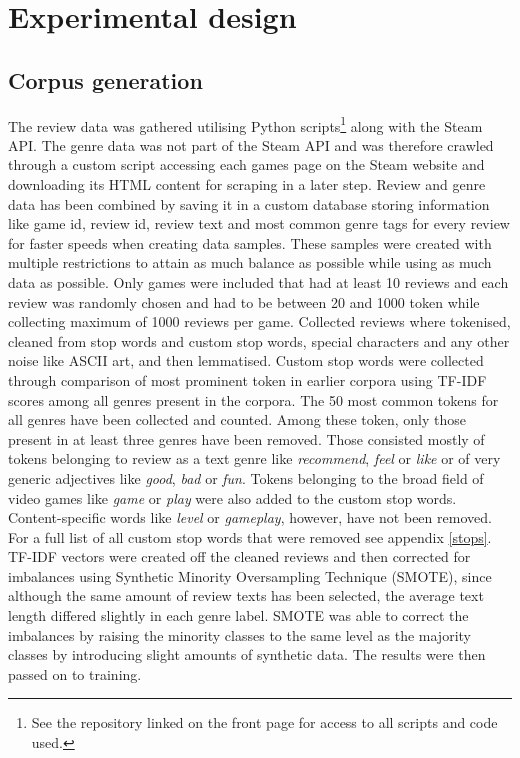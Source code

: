 \documentclass[11pt, a4paper]{article}
\begin{document}
\section{Experimental design}
\subsection{Corpus generation}
The review data was gathered utilising Python scripts\footnote{See the repository linked on the front page for access to all scripts and code used.} along with the Steam API. The genre data was not part of the Steam API and was therefore crawled through a custom script accessing each games page on the Steam website and downloading its HTML content for scraping in a later step. Review and genre data has been combined by saving it in a custom database storing information like game id, review id, review text and most common genre tags for every review for faster speeds when creating data samples. These samples were created with multiple restrictions to attain as much balance as possible while using as much data as possible. Only games were included that had at least 10 reviews and each review was randomly chosen and had to be between 20 and 1000 token while collecting maximum of 1000 reviews per game. Collected reviews where tokenised, cleaned from stop words and custom stop words, special characters and any other noise like ASCII art, and then lemmatised. Custom stop words were collected through comparison of most prominent token in earlier corpora using TF-IDF scores among all genres present in the corpora. The 50 most common tokens for all genres have been collected and counted. Among these token, only those present in at least three genres have been removed. Those consisted mostly of tokens belonging to review as a text genre like \textit{recommend}, \textit{feel} or \textit{like} or of very generic adjectives like \textit{good}, \textit{bad} or \textit{fun}. Tokens belonging to the broad field of video games like \textit{game} or \textit{play} were also added to the custom stop words. Content-specific words like \textit{level} or \textit{gameplay}, however, have not been removed. For a full list of all custom stop words that were removed see appendix \ref{stops}. TF-IDF vectors were created off the cleaned reviews and then corrected for imbalances using Synthetic Minority Oversampling Technique (SMOTE), since although the same amount of review texts has been selected, the average text length differed slightly in each genre label. SMOTE was able to correct the imbalances by raising the minority classes to the same level as the majority classes by introducing slight amounts of synthetic data. The results were then passed on to training.
\end{document}
